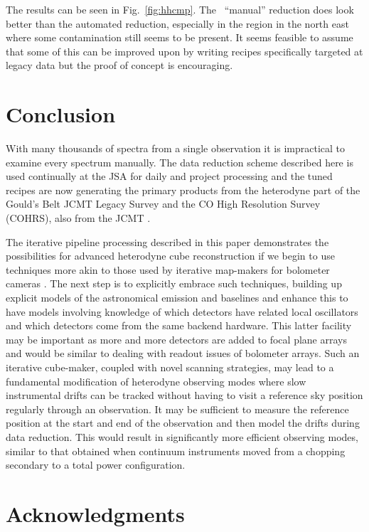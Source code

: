 \documentclass[final,authoryear,5p,times,twocolumn]{elsarticle}
\begin{document}
The results can be seen in Fig.\ \ref{fig:hhcmp}. The \specx\ ``manual''
reduction does look better than the automated reduction, especially in
the region in the north east where some contamination still seems to
be present. It seems feasible to assume that some of this can be
improved upon by writing recipes specifically targeted at legacy data
but the proof of concept is encouraging.

\section{Conclusion}

With many thousands of spectra from a single observation it is
impractical to examine every spectrum manually. The data reduction
scheme described here is used continually at the JSA
\citep{2011ASPC..442..203E} for daily and project processing and the
tuned recipes are now generating the primary products from the
heterodyne part of the Gould's Belt JCMT Legacy Survey
\citep{2007PASP..119..855W} and the CO High Resolution Survey
(COHRS), also from the JCMT \citep{2013ApJS..209....8D}.

The iterative pipeline processing described in this paper demonstrates
the possibilities for advanced heterodyne cube reconstruction if we
begin to use techniques more akin to those used by iterative
map-makers for bolometer cameras
\citep[e.g.][]{2013MNRAS.430.2545C}. The next step is to explicitly
embrace such techniques, building up explicit models of the
astronomical emission and baselines and enhance this to have models
involving knowledge of which detectors have related local oscillators
and which detectors come from the same backend hardware. This latter
facility may be important as more and more detectors are added to
focal plane arrays and would be similar to dealing with readout issues
of bolometer arrays. Such an iterative cube-maker, coupled with novel
scanning strategies, may lead to a fundamental modification of
heterodyne observing modes where slow instrumental drifts can be
tracked without having to visit a reference sky position regularly
through an observation. It may be sufficient to measure the reference
position at the start and end of the observation and then model the
drifts during data reduction. This would result in significantly more
efficient observing modes, similar to that obtained when continuum
instruments moved from a chopping secondary to a total power
configuration.

\section{Acknowledgments}
\end{document}
